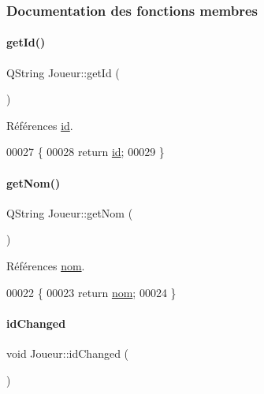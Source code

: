 \subsubsection{Documentation des fonctions membres}
\mbox{\label{class_joueur_a51dd9768967c044036b7d1405370b99d}} 
\paragraph{\texorpdfstring{get\+Id()}{getId()}}
{\footnotesize\ttfamily Q\+String Joueur\+::get\+Id (\begin{DoxyParamCaption}{ }\end{DoxyParamCaption})}



Références \hyperlink{class_joueur_a99c42cd3be344a1348064aca8619c82b}{id}.


\begin{DoxyCode}
00027 \{
00028     \textcolor{keywordflow}{return} \hyperlink{class_joueur_a99c42cd3be344a1348064aca8619c82b}{id};
00029 \}
\end{DoxyCode}
\mbox{\label{class_joueur_a0a9e2adb0d6816def1d5894c389dac96}} 
\paragraph{\texorpdfstring{get\+Nom()}{getNom()}}
{\footnotesize\ttfamily Q\+String Joueur\+::get\+Nom (\begin{DoxyParamCaption}{ }\end{DoxyParamCaption})}



Références \hyperlink{class_joueur_ab06d7f1e6b482299bb03919e0cd2166d}{nom}.


\begin{DoxyCode}
00022 \{
00023     \textcolor{keywordflow}{return} \hyperlink{class_joueur_ab06d7f1e6b482299bb03919e0cd2166d}{nom};
00024 \}
\end{DoxyCode}
\mbox{\label{class_joueur_ada9bb10936494693e15861020ad07ab2}} 
\paragraph{\texorpdfstring{id\+Changed}{idChanged}}
{\footnotesize\ttfamily void Joueur\+::id\+Changed (\begin{DoxyParamCaption}{ }\end{DoxyParamCaption})\hspace{0.3cm}{\ttfamily [signal]}}

